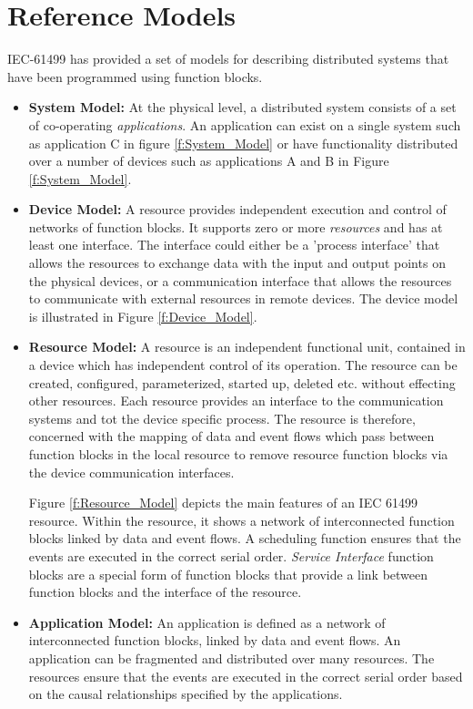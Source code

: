 \section{Reference Models}
IEC-61499 has provided a set of models for describing distributed
systems that have been programmed using function blocks.
\begin{itemize}
\item {\bf System Model:} At the physical level, a distributed
system consists of a set of co-operating {\it applications}. An
application can exist on a single system such as application C in
figure \ref{f:System_Model} or have functionality distributed over
a number of devices such as applications A and B in Figure
\ref{f:System_Model}.

\item {\bf Device Model:} A resource provides independent
execution and control of networks of function blocks. It supports
zero or more {\it resources} and has at least one interface. The
interface could either be a 'process interface' that allows the
resources to exchange data with the input and output points on the
physical devices, or a communication interface that allows the
resources to communicate with external resources in remote
devices. The device model is illustrated in Figure
\ref{f:Device_Model}.


\item {\bf Resource Model:} A resource is an independent functional unit,
contained in a device which has independent control of its
operation. The resource can be created, configured, parameterized,
started up, deleted etc. without effecting other resources. Each
resource provides an interface to the communication systems and
tot the device specific process. The resource is therefore,
concerned with the mapping of data and event flows which pass
between function blocks in the local resource to remove resource
function blocks via the device communication interfaces.

Figure \ref{f:Resource_Model} depicts the main features of an IEC
61499 resource. Within the resource, it shows a network of
interconnected function blocks linked by data and event flows. A
scheduling function ensures that the events are executed in the
correct serial order. {\it Service Interface} function blocks are
a special form of function blocks that provide a link between
function blocks and the interface of the resource.

\item {\bf Application Model:} An application is defined as a
network of interconnected function blocks, linked by data and
event flows. An application can be fragmented and distributed over
many resources. The resources ensure that the events are executed
in the correct serial order based on the causal relationships
specified by the applications.


\end{itemize}
